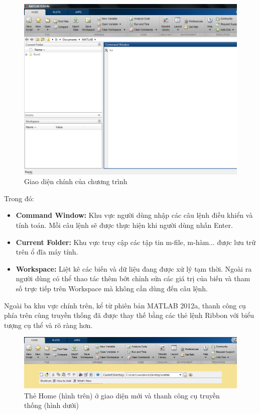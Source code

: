 \documentclass[12pt,a4paper]{article}
\begin{document}
\begin{center}
	\begin{figure}[htp]
	\begin{center}
		\includegraphics[scale=.6]{hinhtieuluan/pic2}
	\end{center}
		\caption{Giao diện chính của chương trình}
		\label{refhinh2}
	\end{figure}
\end{center}
Trong đó:\\
\begin{itemize}
	\item \textbf{Command Window:} Khu vực người dùng nhập các câu lệnh điều khiển và tính toán. Mỗi câu lệnh sẽ được thực hiện khi người dùng nhấn Enter.
	\item \textbf{Current Folder:} Khu vực truy cập các tập tin m-file, m-hàm... được lưu trữ trên ổ đĩa máy tính.
	\item \textbf{Workspace:} Liệt kê các biến và dữ liệu đang được xử lý tạm thời. Ngoài ra người dùng có thể thao tác thêm bớt chỉnh sửa các giá trị của biến và tham số trực tiếp trên Workspace mà không cần dùng đến câu lệnh.
\end{itemize}
Ngoài ba khu vực chính trên, kể từ phiên bản MATLAB 2012a, thanh công cụ phía trên cùng truyền thống đã được thay thế bằng các thẻ lệnh Ribbon với biểu tượng cụ thể và rõ ràng hơn.\\
\begin{center}
	\begin{figure}[htp]
		\begin{center}
		\includegraphics[scale=.5]{hinhtieuluan/pic3}
		\end{center}
		\caption{Thẻ Home (hình trên) ở giao diện mới và thanh công cụ truyền thống (hình dưới)}
		\label{refhinh3}
	\end{figure}
\end{center}
\end{document}
